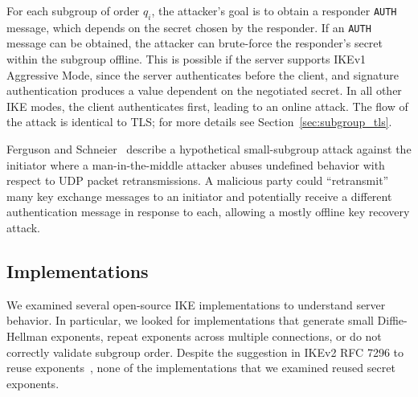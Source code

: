 For each subgroup of order $q_i$, the attacker's goal is to obtain a responder
\texttt{AUTH} message, which depends on the secret chosen by the responder. If
an \texttt{AUTH} message can be obtained, the attacker can brute-force the
responder's secret within the subgroup offline. This is possible if the server
supports IKEv1 Aggressive Mode, since the server authenticates before the
client, and signature authentication produces a value dependent on the
negotiated secret.  In all other IKE modes, the client authenticates first,
leading to an online attack. The flow of the attack is identical to TLS; for
more details see Section~\ref{sec:subgroup_tls}.

Ferguson and Schneier~\cite{ferguson2000cryptographic} describe a hypothetical
small-subgroup attack against the initiator where a man-in-the-middle attacker
abuses undefined behavior with respect to UDP packet retransmissions. A
malicious party could ``retransmit'' many key exchange messages to an initiator
and potentially receive a different authentication message in response to each,
allowing a mostly offline key recovery attack.


\subsection{Implementations}

We examined several open-source IKE implementations to understand server
behavior.  In particular, we looked for implementations that generate small
Diffie-Hellman exponents, repeat exponents across multiple connections, or do
not correctly validate subgroup order. Despite the suggestion in IKEv2 RFC 7296
to reuse exponents~\cite{rfc7296}, none of the implementations that we examined
reused secret exponents. 


